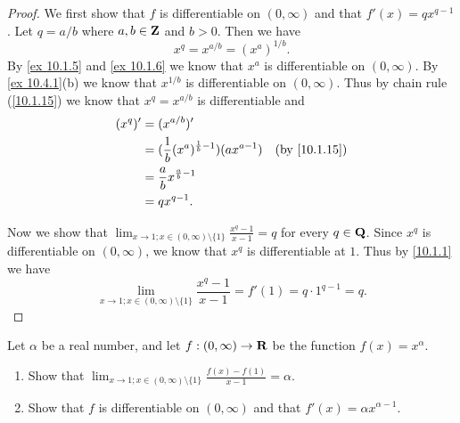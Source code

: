 \begin{proof}
  We first show that \(f\) is differentiable on \((0, \infty)\) and that \(f'(x) = q x^{q - 1}\).
  Let \(q = a / b\) where \(a, b \in \mathbf{Z}\) and \(b > 0\).
  Then we have
  \[
    x^q = x^{a / b} = (x^a)^{1 / b}.
  \]
  By \cref{ex 10.1.5} and \cref{ex 10.1.6} we know that \(x^a\) is differentiable on \((0, \infty)\).
  By \cref{ex 10.4.1}(b) we know that \(x^{1 / b}\) is differentiable on \((0, \infty)\).
  Thus by chain rule (\cref{10.1.15}) we know that \(x^q = x^{a / b}\) is differentiable and
  \begin{align*}
    (x^q)' & = (x^{a / b})'                                                                     \\
           & = (\frac{1}{b} (x^a)^{\frac{1}{b} - 1}) (a x^{a - 1}) & \text{(by \cref{10.1.15})} \\
           & = \frac{a}{b} x^{\frac{a}{b} - 1}                                                  \\
           & = q x^{q - 1}.
  \end{align*}

  Now we show that \(\lim_{x \to 1 ; x \in (0, \infty) \setminus \{1\}} \frac{x^q - 1}{x - 1} = q\) for every \(q \in \mathbf{Q}\).
  Since \(x^q\) is differentiable on \((0, \infty)\), we know that \(x^q\) is differentiable at \(1\).
  Thus by \cref{10.1.1} we have
  \[
    \lim_{x \to 1 ; x \in (0, \infty) \setminus \{1\}} \frac{x^q - 1}{x - 1} = f'(1) = q \cdot 1^{q - 1} = q.
  \]
\end{proof}

\begin{exercise}\label{ex 10.4.3}
  Let \(\alpha\) be a real number, and let \(f : (0, \infty) \to \mathbf{R}\) be the function \(f(x) = x^{\alpha}\).
  \begin{enumerate}
    \item Show that \(\lim_{x \to 1 ; x \in (0, \infty) \setminus \{1\}} \frac{f(x) - f(1)}{x - 1} = \alpha\).
    \item Show that \(f\) is differentiable on \((0, \infty)\) and that \(f'(x) = \alpha x^{\alpha - 1}\).
  \end{enumerate}
\end{exercise}

